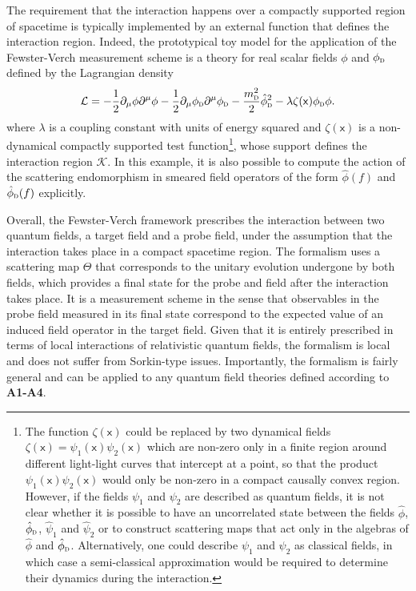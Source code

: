 \documentclass[letterpaper,12pt,titlepage,oneside,final]{book}
\newcommand{\mf}{\mathsf}%
\newcommand{\tc}[1]{\textsc{#1}}
\begin{document}
The requirement that the interaction happens over a compactly supported region of spacetime is typically implemented by an external function that defines the interaction region. Indeed, the prototypical toy model for the application of the Fewster-Verch measurement scheme is a theory for real scalar fields $\phi$ and $\phi_\tc{d}$ defined by the Lagrangian density
\begin{equation}\label{eq:LagphiphidFV}
    \mathcal{L} = - \frac{1}{2}\partial_\mu \phi \partial^\mu \phi - \frac{1}{2}\partial_\mu \phi_\tc{d} \partial^\mu \phi_\tc{d} - \frac{m_\tc{d}^2}{2}\hat{\phi}_\tc{d}^2 - \lambda \zeta(\mf x)\phi_\tc{d}\phi.
\end{equation}
where $\lambda$ is a coupling constant with units of energy squared and $\zeta(\mf x)$ is a non-dynamical compactly supported test function\footnote{The function $\zeta(\mf x)$ could be replaced by two dynamical fields $\zeta(\mf x) = \psi_1(\mf x)\psi_2(\mf x)$ which are non-zero only in a finite region around different light-light curves that intercept at a point, so that the product $\psi_1(\mf x)\psi_2(\mf x)$ would only be non-zero in a compact causally convex region. However, if the fields $\psi_1$ and $\psi_2$ are described as quantum fields, it is not clear whether it is possible to have an uncorrelated state between the fields $\hat{\phi}$, $\hat{\phi}_\tc{d}$, $\hat{\psi}_1$ and $\hat{\psi}_2$ or to construct scattering maps that act only in the algebras of $\hat{\phi}$ and $\hat{\phi}_\tc{d}$. Alternatively, one could describe $\psi_1$ and $\psi_2$ as classical fields, in which case a semi-classical approximation would be required to determine their dynamics during the interaction.}, whose support defines the interaction region $\mathcal{K}$. In this example, it is also possible to compute the action of the scattering endomorphism in smeared field operators of the form $\hat{\phi}(f)$ and $\hat{\phi}_\tc{d}(f)$ explicitly. %

Overall, the Fewster-Verch framework prescribes the interaction between two quantum fields, a target field and a probe field, under the assumption that the interaction takes place in a compact spacetime region. The formalism uses a scattering map $\Theta$ that corresponds to the unitary evolution undergone by both fields, which provides a final state for the probe and field after the interaction takes place. It is a measurement scheme in the sense that observables in the probe field measured in its final state correspond to the expected value of an induced field operator in the target field. Given that it is entirely prescribed in terms of local interactions of relativistic quantum fields, the formalism is local and does not suffer from Sorkin-type issues. Importantly, the formalism is fairly general and can be applied to any quantum field theories defined according to \textbf{A1-A4}.
\end{document}
